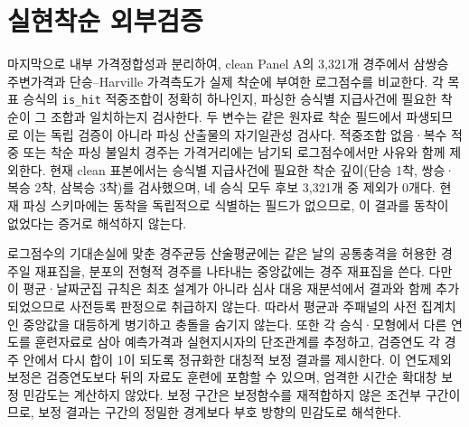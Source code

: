 \section{실현착순 외부검증}
\label{sec:external-validation}

마지막으로 내부 가격정합성과 분리하여, clean Panel A의 3,321개 경주에서
삼쌍승 주변가격과 단승--Harville 가격측도가 실제 착순에 부여한 로그점수를
비교한다. 각 목표 승식의 \texttt{is\_hit} 적중조합이 정확히 하나인지, 파싱한
승식별 지급사건에 필요한 착순이 그 조합과 일치하는지 검사한다. 두 변수는 같은
원자료 착순 필드에서 파생되므로 이는 독립 검증이 아니라 파싱 산출물의
자기일관성 검사다. 적중조합 없음·복수 적중 또는 착순 파싱 불일치 경주는
가격거리에는 남기되 로그점수에서만 사유와 함께 제외한다. 현재
clean 표본에서는 승식별 지급사건에 필요한 착순 깊이(단승 1착, 쌍승·복승
2착, 삼복승 3착)를 검사했으며, 네 승식 모두 후보 3,321개 중 제외가 0개다.
현재 파싱 스키마에는 동착을 독립적으로 식별하는 필드가 없으므로, 이 결과를
동착이 없었다는 증거로 해석하지 않는다.

\begin{table}[htbp]
\centering
\caption{Clean Panel A의 실현착순 로그점수 개선. 개선폭은 단승--Harville
로그점수에서 삼쌍승 주변화 로그점수를 뺀 값으로, 양수일수록 삼쌍승 주변화가
낫다. 위 패널의 미보정 평균은 경주일 군집 bootstrap, 미보정 중앙값은 경주
bootstrap 95\% 구간을 보고한다. 아래 패널의 보정 열은 두 가격측도에 같은
연도제외 단조보정을 각각 적용한 결과다. 보정 무구속 열은 어느 모형도 $10^{-12}$ 하한에 닿지 않은
경주만 남긴 민감도이고, EPS 구속은 `미보정 main/Harville; 보정
main/Harville' 순서의 구속 관측 수다. 보정 구간은 훈련 표본에서 얻은
보정함수를 고정한 조건부 구간으로, 보정자 추정 불확실성과 중첩 fold 의존성을
반영하지 않는다. 단승 행도 항등식이 아니라 삼쌍승 주변 단승가격과 실제
단승가격의 실질 비교다. 이 표는 Harville 대비 상대비교에 한정하며 비정보적
기준 대비 절대 예측력의 크기는 판정하지 않는다.}
\label{tab:main-external-log-scores}
{\small\centering\par}
\end{table}

로그점수의 기대손실에 맞춘 경주균등 산술평균에는 같은 날의 공통충격을 허용한
경주일 재표집을, 분포의 전형적 경주를 나타내는 중앙값에는 경주 재표집을 쓴다.
다만 이 평균·날짜군집 규칙은 최초 설계가 아니라 심사 대응 재분석에서 결과와
함께 추가되었으므로 사전등록 판정으로 취급하지 않는다. 따라서 평균과 주패널의
사전 집계치인 중앙값을 대등하게 병기하고 충돌을 숨기지 않는다. 또한 각
승식·모형에서 다른 연도를 훈련자료로 삼아 예측가격과 실현지시자의 단조관계를
추정하고, 검증연도 각 경주 안에서 다시 합이 1이 되도록 정규화한 대칭적 보정
결과를 제시한다. 이 연도제외 보정은 검증연도보다 뒤의 자료도 훈련에 포함할 수
있으며, 엄격한 시간순 확대창 보정 민감도는 계산하지 않았다. 보정 구간은
보정함수를 재적합하지 않은 조건부 구간이므로, 보정 결과는 구간의 정밀한
경계보다 부호 방향의 민감도로 해석한다.

